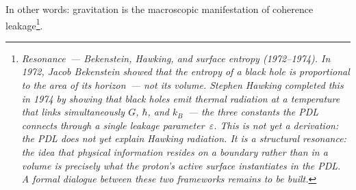 \documentclass[11pt, a4paper, openright]{book}
\begin{document}
In other words: gravitation is the macroscopic manifestation of coherence leakage\footnote{\textit{Resonance~--- Bekenstein, Hawking, and surface entropy (1972--1974). In 1972, Jacob Bekenstein showed that the entropy of a black hole is proportional to the area of its horizon~--- not its volume. Stephen Hawking completed this in 1974 by showing that black holes emit thermal radiation at a temperature that links simultaneously $G$, $\hbar$, and $k_B$~--- the three constants the PDL connects through a single leakage parameter~$\varepsilon$. This is not yet a derivation: the PDL does not yet explain Hawking radiation. It is a structural resonance: the idea that physical information resides on a boundary rather than in a volume is precisely what the proton's active surface instantiates in the PDL\@. A formal dialogue between these two frameworks remains to be built.}}. 
\end{document}
